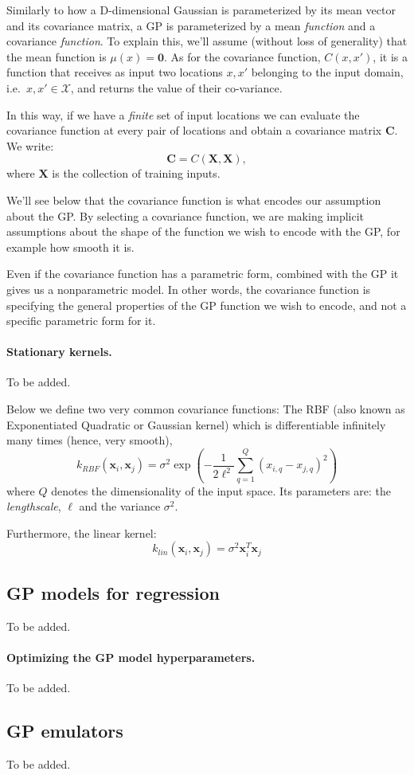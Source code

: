 \documentclass[%
oneside,                 %
final,                   %
10pt]{article}
\begin{document}
Similarly to how a D-dimensional Gaussian is parameterized by its mean vector and its covariance matrix, a GP is parameterized by a mean \emph{function} and a covariance \emph{function}. To explain this, we'll assume (without loss of generality) that the mean function is $\mu(x) = \mathbf{0}$. As for the covariance function, $C(x,x')$, it is a function that receives as input two locations $x,x'$ belonging to the input domain, i.e.~$x,x' \in \mathcal{X}$, and returns the value of their co-variance.

In this way, if we have a \emph{finite} set of input locations we can evaluate the covariance function at every pair of locations and obtain a covariance matrix $\mathbf{C}$. We write:
\[ \mathbf{C} = C(\mathbf{X}, \mathbf{X}), \]
where $\mathbf{X}$ is the collection of training inputs.

We'll see below that the covariance function is what encodes our assumption about the GP. By selecting a covariance function, we are making implicit assumptions about the shape of the function we wish to encode with the GP, for example how smooth it is.

Even if the covariance function has a parametric form, combined with the GP it gives us a nonparametric model. In other words, the covariance function is specifying the general properties of the GP function we wish to encode, and not a specific parametric form for it.


\paragraph{Stationary kernels.}
To be added.

Below we define two very common covariance functions: The RBF (also known as Exponentiated Quadratic or Gaussian kernel) which is differentiable infinitely many times (hence, very smooth),
\[ k_{RBF}(\mathbf{x}_{i},\mathbf{x}_{j}) = \sigma^2 \exp \left( -\frac{1}{2\ell^2} \sum_{q=1}^Q (x_{i,q} - x_{j,q})^2\right) \]
where $Q$ denotes the dimensionality of the input space. Its parameters are: the \emph{lengthscale}, $\ell$ and the variance $\sigma^2$. 

Furthermore, the linear kernel:
\[ k_{lin}(\mathbf{x}_{i},\mathbf{x}_{j}) = \sigma^2 \mathbf{x}_{i}^T \mathbf{x}_{j} \]

\subsection{GP models for regression}
To be added.

\paragraph{Optimizing the GP model hyperparameters.}
To be added.

\subsection{GP emulators}

To be added.


\end{document}
